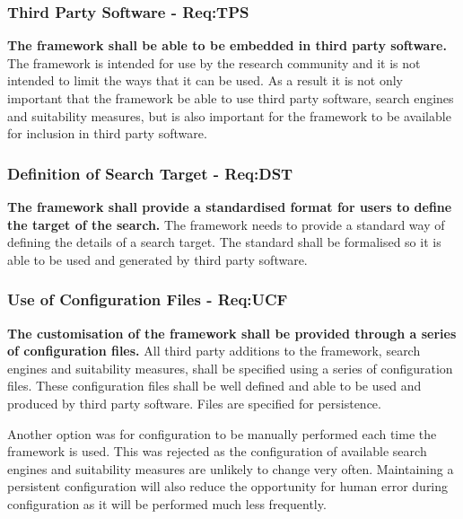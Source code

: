 \subsubsection{Third Party Software - Req:TPS}
\label{sec:reqtps}
\textbf{The framework shall be able to be embedded in third party software.}
The framework is intended for use by the research community and it is not intended to limit the ways that it can be used.
As a result it is not only important that the framework be able to use third party software, search engines and suitability measures, but is also important for the framework to be available for inclusion in third party software.

\subsubsection{Definition of Search Target - Req:DST}
\label{sec:reqdst}
\textbf{The framework shall provide a standardised format for users to define the target of the search.}
The framework needs to provide a standard way of defining the details of a search target.
The standard shall be formalised so it is able to be used and generated by third party software.

\subsubsection{Use of Configuration Files - Req:UCF}
\label{sec:requcf}
\textbf{The customisation of the framework shall be provided through a series of configuration files.}
All third party additions to the framework, search engines and suitability measures, shall be specified using a series of configuration files.
These configuration files shall be well defined and able to be used and produced by third party software.
Files are specified for persistence.

Another option was for configuration to be manually performed each time the framework is used.
This was rejected as the configuration of available search engines and suitability measures are unlikely to change very often.
Maintaining a persistent configuration will also reduce the opportunity for human error during configuration as it will be performed much less frequently.

